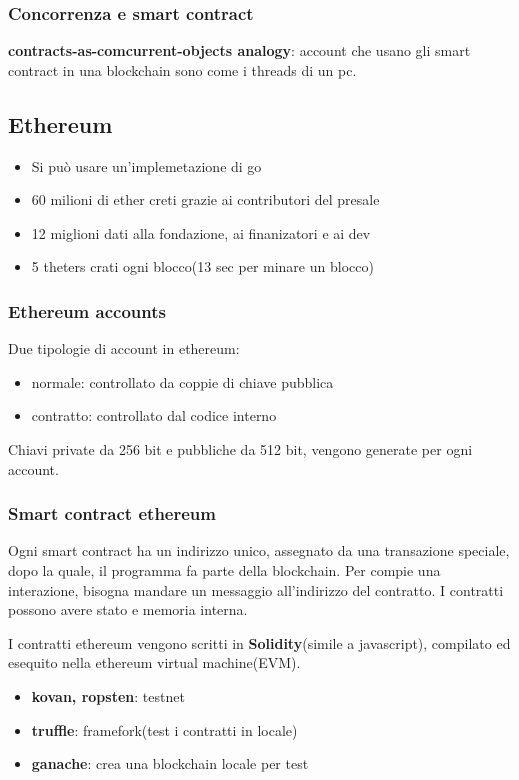 \subsubsection{Concorrenza e smart contract}

\textbf{contracts-as-comcurrent-objects analogy}: account che usano gli smart contract in una blockchain sono come i threads di un pc.

\subsection{Ethereum}
\begin{itemize}
    \item Si può usare un'implemetazione di go
    \item 60 milioni di ether creti grazie ai contributori del presale
    \item 12 miglioni dati alla fondazione, ai finanizatori e ai dev
    \item 5 theters crati ogni blocco(13 sec per minare un blocco)
\end{itemize}

\subsubsection{Ethereum accounts}
Due tipologie di account in ethereum:
\begin{itemize}
    \item normale: controllato da coppie di chiave pubblica
    \item contratto: controllato dal codice interno
\end{itemize}

Chiavi private da 256 bit e pubbliche da 512 bit, vengono generate per ogni account.

\subsubsection{Smart contract ethereum}
Ogni smart contract ha un indirizzo unico, assegnato da una transazione speciale, dopo la quale, il programma fa parte della blockchain.
Per compie una interazione, bisogna mandare un messaggio all'indirizzo del contratto.
I contratti possono avere stato e memoria interna.

I contratti ethereum vengono scritti in \textbf{Solidity}(simile a javascript), compilato ed esequito nella ethereum virtual machine(EVM).

\begin{itemize}
    \item \textbf{kovan, ropsten}: testnet
    \item \textbf{truffle}: framefork(test i contratti in locale)
    \item \textbf{ganache}: crea una blockchain locale per test
\end{itemize}

